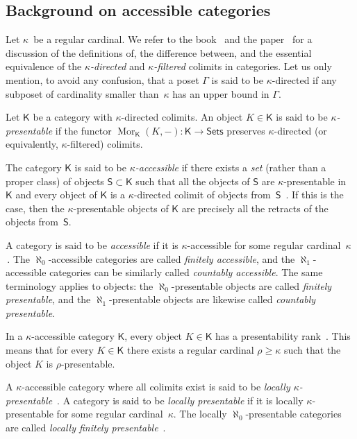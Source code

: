 \documentclass[12pt,a4paper]{amsart}
\newcommand{\+}{\protect\nobreakdash-}
\renewcommand{\:}{\colon}
\newcommand{\rarrow}{\longrightarrow}
\DeclareMathOperator{\Mor}{Mor}
\newcommand{\Sets}{\mathsf{Sets}}
\newcommand{\sK}{\mathsf K}
\newcommand{\sS}{\mathsf S}
\theoremstyle{plain}
\theoremstyle{definition}
\begin{document}
\subsection{Background on accessible categories}
 Let $\kappa$~be a regular cardinal.
 We refer to the book~\cite[Theorem~1.5, Definition~1.13, and
Remark~1.21]{AR} and the paper~\cite{AN} for a discussion of
the definitions of, the difference between, and the essential
equivalence of the \emph{$\kappa$\+directed} and
\emph{$\kappa$\+filtered} colimits in categories.
 Let us only mention, to avoid any confusion, that a poset $\Gamma$
is said to be $\kappa$\+directed if any subposet of cardinality
smaller than~$\kappa$ has an upper bound in $\Gamma$.

 Let $\sK$ be a category with $\kappa$\+directed colimits.
 An object $K\in\sK$ is said to be \emph{$\kappa$\+presentable}
if the functor $\Mor_\sK(K,{-})\:\sK\rarrow\Sets$ preserves
$\kappa$\+directed (or equivalently, $\kappa$\+filtered) colimits.

 The category $\sK$ is said to be \emph{$\kappa$\+accessible} if
there exists a \emph{set} (rather than a proper class) of objects
$\sS\subset\sK$ such that all the objects of $\sS$ are
$\kappa$\+presentable in $\sK$ and every object of $\sK$ is
a $\kappa$\+directed colimit of objects from~$\sS$
\,\cite[Definition~2.1]{AR}.
 If this is the case, then the $\kappa$\+presentable objects of
$\sK$ are precisely all the retracts of the objects from~$\sS$.

 A category is said to be \emph{accessible} if it is
$\kappa$\+accessible for some regular cardinal~$\kappa$
\,\cite[Remark~2.2(1)]{AR}.
 The $\aleph_0$\+accessible categories are called \emph{finitely
accessible}, and the $\aleph_1$\+accessible categories can be
similarly called \emph{countably accessible}.
 The same terminology applies to objects: the $\aleph_0$\+presentable
objects are called \emph{finitely presentable}, and
the $\aleph_1$\+presentable objects are likewise called
\emph{countably presentable}.

 In a $\kappa$\+accessible category $\sK$, every object $K\in\sK$ has
a presentability rank~\cite[[Remark~2.2(3)]{AR}.
 This means that for every $K\in\sK$ there exists a regular cardinal
$\rho\ge\kappa$ such that the object $K$ is $\rho$\+presentable.

 A $\kappa$\+accessible category where all colimits exist is said to
be \emph{locally\/ $\kappa$\+presentable}~\cite[Definition~1.17
and Theorem~1.20]{AR}.
 A category is said to be \emph{locally presentable} if it is
locally $\kappa$\+presentable for some regular cardinal~$\kappa$.
 The locally $\aleph_0$\+presentable categories are called
\emph{locally finitely presentable}~\cite[Definition~1.9 and
Theorem~1.11]{AR}.
\end{document}
